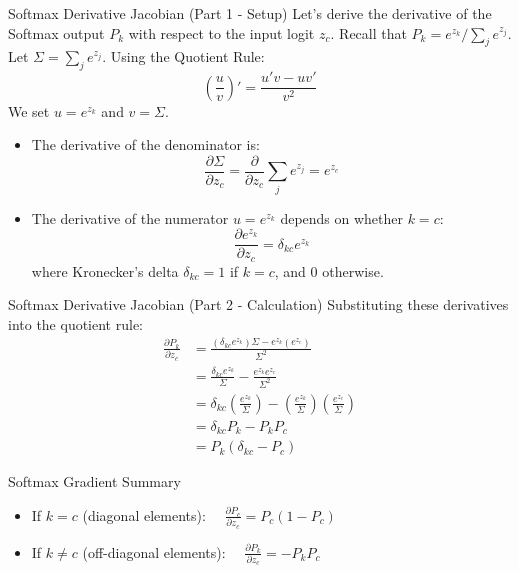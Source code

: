 \documentclass[9pt]{beamer}
\begin{document}
\begin{frame}{Softmax Derivative Jacobian (Part 1 - Setup)}
  Let's derive the derivative of the Softmax output $P_k$ with respect to the input logit $z_c$.
  Recall that $P_k = e^{z_k} / \sum_{j} e^{z_j}$. Let $\Sigma = \sum_{j} e^{z_j}$.
  Using the Quotient Rule:
  $$\left( \frac{u}{v} \right)' = \frac{u'v - uv'}{v^2}$$
  We set $u = e^{z_k}$ and $v = \Sigma$.
  \begin{itemize}
    \item The derivative of the denominator is:
      $$\frac{\partial \Sigma}{\partial z_c} = \frac{\partial}{\partial z_c} \sum_{j} e^{z_j} = e^{z_c}$$
    \item The derivative of the numerator $u = e^{z_k}$ depends on whether $k = c$:
      $$\frac{\partial e^{z_k}}{\partial z_c} = \delta_{kc} e^{z_k}$$
      where Kronecker's delta $\delta_{kc} = 1$ if $k=c$, and $0$ otherwise.
  \end{itemize}
\end{frame}

\begin{frame}{Softmax Derivative Jacobian (Part 2 - Calculation)}
  Substituting these derivatives into the quotient rule:
  \begin{align*}
    \frac{\partial P_k}{\partial z_c} &= \frac{\left( \delta_{kc} e^{z_k} \right) \Sigma - e^{z_k} \left( e^{z_c} \right)}{\Sigma^2} \\
    &= \frac{\delta_{kc} e^{z_k}}{\Sigma} - \frac{e^{z_k} e^{z_c}}{\Sigma^2} \\
    &= \delta_{kc} \left( \frac{e^{z_k}}{\Sigma} \right) - \left( \frac{e^{z_k}}{\Sigma} \right) \left( \frac{e^{z_c}}{\Sigma} \right) \\
    &= \delta_{kc} P_k - P_k P_c \\
    &= P_k (\delta_{kc} - P_c)
  \end{align*}
  \begin{block}{Softmax Gradient Summary}
    \begin{itemize}
      \item If $k = c$ (diagonal elements): $\quad \frac{\partial P_c}{\partial z_c} = P_c (1 - P_c)$
      \item If $k \neq c$ (off-diagonal elements): $\quad \frac{\partial P_k}{\partial z_c} = - P_k P_c$
    \end{itemize}
  \end{block}
\end{frame}
\end{document}
